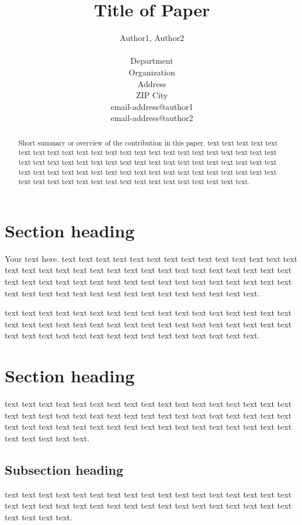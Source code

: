 \documentclass[english]{lni}
\author{
	Author1, Author2 \\
	\\
	Department \\
	Organization \\
	Address \\
	ZIP City \\
	email-address@author1 \\
	email-address@author2
}
\title{Title of Paper}
\begin{document}
\maketitle

\begin{abstract}
Short summary or overview of the contribution in this paper. text text text text text text text text text text text text text text text text text text text text text text text text text text text text text text text text text text text text text text text text text text text text text text text text text text text text text text text text text text text text text text text text text text text text text text text text text text text.
\end{abstract}

\section{Section heading}

Your text here. text text text text text text text text text text text text text text text text text text text text text text text text text text text text text text text text text text text text text text text text text text text text text text text text text text text text text text text text text text text text text text text.

text text text text text text text text text text text text text text text text text text text text text text text text text text text text text text text text text text text text text text text text text text text text text text text text text.

\section{Section heading}

text text text text text text text text text text text text text text text text text text text text text text text text text text text text text text text text text text text text text text text text text text text text text text text text text text text text text text text text.

\subsection{Subsection heading}

text text text text text text text text text text text text text text text text text text text text text text text text text text text text text text text text text text text text text text.
\end{document}
